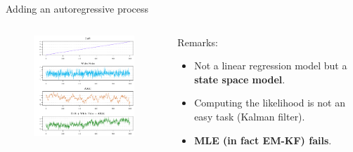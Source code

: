 \documentclass[envcountsect,usenames,dvipsnames]{beamer}
\theoremstyle{mystyle}
\begin{document}
\begin{frame}{Adding an autoregressive process}
 	\begin{columns}
	\begin{column}{0.6\textwidth}
		\vspace{0.3cm}
		\begin{figure}
			\vspace{-0.8cm}
		    \centering
		  \includegraphics[width = 7cm]{Images/DR_WN_ARPub}
		\end{figure}
	
	\end{column}
	\begin{column}{0.35\textwidth}
	\begin{block}{Remarks:}
		\begin{itemize}
			\item Not a linear regression model but a \textbf{{\color{beamer@UIUCblue}state space model}}.
			\item Computing the likelihood is not an easy task (Kalman filter).
			\item \textbf{{\color{beamer@UIUCblue}MLE (in fact EM-KF) fails}}.
		\end{itemize}
	\end{block}
	\end{column}
	\end{columns}	
\end{frame}
\end{document}
